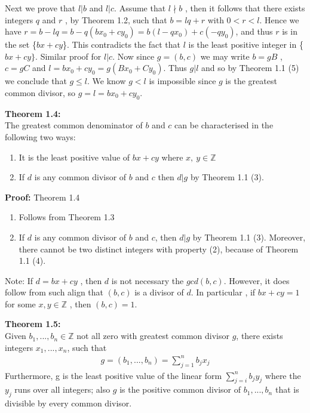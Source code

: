 \documentclass[a4paper]{article}
\begin{document}
Next we prove that $l|b$ and $l|c$. Assume that $l \nmid b$ , then it follows
that there exists integers $q$ and $r$ , by Theorem 1.2, such that $b=lq+r$
with $0<r<l$. Hence we have $r=b-lq=b-q(bx_0+cy_0)=b(l-qx_0)+c(-qy_0)$, and
thus $r$ is in the set \{$bx+cy$\}. This contradicts the fact that $l$ is
the least positive integer in \{$bx+cy\}$. Similar proof for $l|c$. Now since
$g=(b,c)$ we may write $b=gB$ , $c=gC$ and $l=bx_0+cy_0=g(Bx_0+Cy_0)$. Thus
$g|l $ and so by Theorem 1.1 (5) we conclude that $g \leq l$. We know $g<l$
is impossible since $g$ is the greatest common divisor, so $g=l=bx_0+cy_0$.


\textbf{Theorem 1.4:}\\
The greatest common denominator of $b$ and $c$ can be characterised in the
following two ways:
\begin{enumerate}
    \item It is the least positive value of $bx+cy$ where $x,\ y\in\mathbb{Z}$
    \item If $d$ is any common divisor of $b$ and $c$ then $d|g$ by Theorem
1.1 (3).
\end{enumerate}

\textbf{Proof:} Theorem 1.4

\begin{enumerate}
\item Follows from Theorem 1.3
\item If $d$ is any common divisor of $b$ and $c$, then $d|g$ by Theorem
1.1 (3). Moreover, there cannot be two distinct integers with property (2),
because of Theorem 1.1 (4).
\end{enumerate}

Note: If $d=bx+cy$ , then $d$ is not necessary the $gcd(b,c)$. However, it
does follow from such align that $(b,c)$ is a divisor of $d$. In particular
, if $bx+cy=1$ for some $x,y\in\mathbb{Z}$ , then $(b,c)=1$.

\textbf{Theorem 1.5:}\\
Given $b_1,...,b_n\in\mathbb{Z}$ not all zero with greatest common divisor
$g$,
there exists integers $x_1,...,x_n$,  such that
\begin{align}
    g=(b_1,...,b_n)=\sum^n_{j=1}b_jx_j
\end{align}
Furthermore, g is the least positive value of the linear form $\sum^n_{j=i}b_jy_j$
where the $y_j$ runs over all integers; also $g$ is the positive common
divisor of $b_1,...,b_n$ that is divisible by every common divisor.
\end{document}
